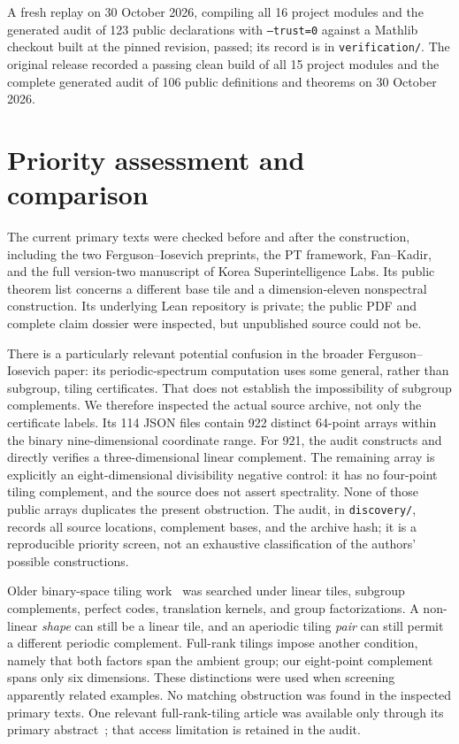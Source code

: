 \documentclass[11pt]{article}
\theoremstyle{definition}\newtheorem{definition}[theorem]{Definition}
\theoremstyle{remark}\newtheorem{remark}[theorem]{Remark}
\newcommand{\code}[1]{\texttt{\small #1}}
\newcommand{\replaystatus}{A fresh replay on 30 October 2026, compiling all 16 project modules and the generated audit of 123 public declarations with \code{--trust=0} against a Mathlib checkout built at the pinned revision, passed; its record is in \code{verification/}.}
\begin{document}
\replaystatus{} The original release recorded a passing clean build of all 15 project modules and the complete generated audit of 106 public definitions and theorems on 30 October 2026.

\section{Priority assessment and comparison}

The current primary texts were checked before and after the construction, including the two Ferguson--Iosevich preprints, the PT framework, Fan--Kadir, and the full version-two manuscript of Korea Superintelligence Labs. Its public theorem list concerns a different base tile and a dimension-eleven nonspectral construction. Its underlying Lean repository is private; the public PDF and complete claim dossier were inspected, but unpublished source could not be.

There is a particularly relevant potential confusion in the broader Ferguson--Iosevich paper: its periodic-spectrum computation uses some general, rather than subgroup, tiling certificates. That does not establish the impossibility of subgroup complements. We therefore inspected the actual source archive, not only the certificate labels. Its 114 JSON files contain 922 distinct 64-point arrays within the binary nine-dimensional coordinate range. For 921, the audit constructs and directly verifies a three-dimensional linear complement. The remaining array is explicitly an eight-dimensional divisibility negative control: it has no four-point tiling complement, and the source does not assert spectrality. None of those public arrays duplicates the present obstruction. The audit, in \code{discovery/}, records all source locations, complement bases, and the archive hash; it is a reproducible priority screen, not an exhaustive classification of the authors' possible constructions.

Older binary-space tiling work~\cite{clvz,ev,dinitz,szaboward} was searched under linear tiles, subgroup complements, perfect codes, translation kernels, and group factorizations. A non-linear \emph{shape} can still be a linear tile, and an aperiodic tiling \emph{pair} can still permit a different periodic complement. Full-rank tilings impose another condition, namely that both factors span the ambient group; our eight-point complement spans only six dimensions. These distinctions were used when screening apparently related examples. No matching obstruction was found in the inspected primary texts. One relevant full-rank-tiling article was available only through its primary abstract~\cite{ov}; that access limitation is retained in the audit.
\end{document}
